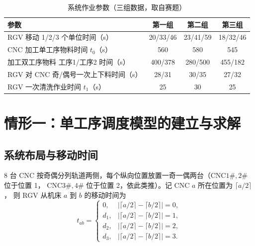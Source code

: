 \documentclass{cumcmthesis}
\begin{document}
\begin{table}[!htbp]
\caption{系统作业参数（三组数据，取自赛题）}\label{tab:param}\centering
\small
\begin{tabular}{lccc}
    \toprule
    参数 & 第一组 & 第二组 & 第三组 \\
    \midrule
    RGV 移动 1/2/3 个单位时间（s）        & 20/33/46 & 23/41/59 & 18/32/46 \\
    CNC 加工单工序物料时间 $t_0$（s）      & 560      & 580      & 545      \\
    加工双工序物料 工序1/工序2 时间（s）   & 400/378  & 280/500  & 455/182  \\
    RGV 对 CNC 奇/偶号一次上下料时间（s）  & 28/31    & 30/35    & 27/32    \\
    RGV 一次清洗作业时间 $t_1$（s）        & 25       & 30       & 25       \\
    \bottomrule
\end{tabular}
\end{table}

\section{情形一：单工序调度模型的建立与求解}
\subsection{系统布局与移动时间}
8 台 CNC 按奇偶分列轨道两侧，每个纵向位置放置一奇一偶两台（CNC$1\#,2\#$ 位于位置 1，
CNC$3\#,4\#$ 位于位置 2，依此类推）。记 CNC $a$ 所在位置为 $\lceil a/2\rceil$，
则 RGV 从机床 $a$ 到 $b$ 的移动时间为
\begin{equation}
t_{ab}=\begin{cases}
0,   & \big|\lceil a/2\rceil-\lceil b/2\rceil\big|=0,\\
d_1, & \big|\lceil a/2\rceil-\lceil b/2\rceil\big|=1,\\
d_2, & \big|\lceil a/2\rceil-\lceil b/2\rceil\big|=2,\\
d_3, & \big|\lceil a/2\rceil-\lceil b/2\rceil\big|=3.
\end{cases}
\end{equation}
\end{document}
